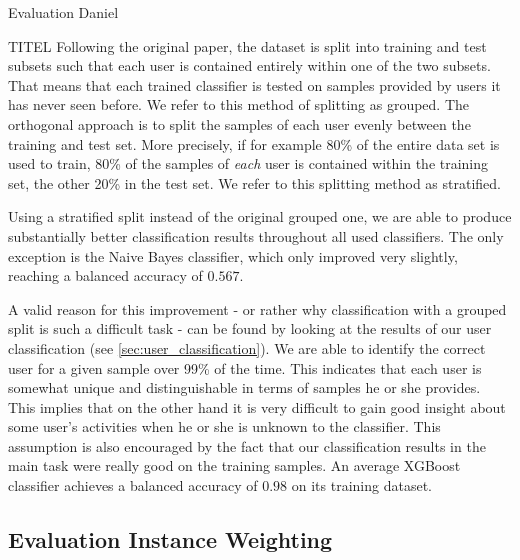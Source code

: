 \begin{section}{Evaluation Daniel}
	\begin{subsection}{TITEL}\label{subsec:stratified}
		Following the original paper, the dataset is split into training and test subsets such that each user is contained entirely within one of the two subsets. That means that each trained classifier is tested on samples provided by users it has never seen before. We refer to this method of splitting as \glqq grouped\grqq{}. The orthogonal approach is to split the samples of each user evenly between the training and test set. More precisely, if for example 80\% of the entire data set is used to train, 80\% of the samples of \emph{each} user is contained within the training set, the other 20\% in the test set. We refer to this splitting method as \glqq stratified\grqq{}. \par
		Using a stratified split instead of the original grouped one, we are able to produce substantially better classification results throughout all used classifiers. The only exception is the Naive Bayes classifier, which only improved very slightly, reaching a balanced accuracy of $0.567$. \par
		A valid reason for this improvement - or rather why classification with a grouped split is such a difficult task - can be found by looking at the results of our user classification (see \ref{sec:user_classification}). We are able to identify the correct user for a given sample over 99\% of the time. This indicates that each user is somewhat unique and distinguishable in terms of samples he or she provides. This implies that on the other hand it is very difficult to gain good insight about some user's activities when he or she is unknown to the classifier. This assumption is also encouraged by the fact that our classification results in the main task were really good on the training samples. An average XGBoost classifier achieves a balanced accuracy of $0.98$ on its training dataset. 
	\end{subsection}
	
	\subsection{Evaluation Instance Weighting}
	

\end{section}
